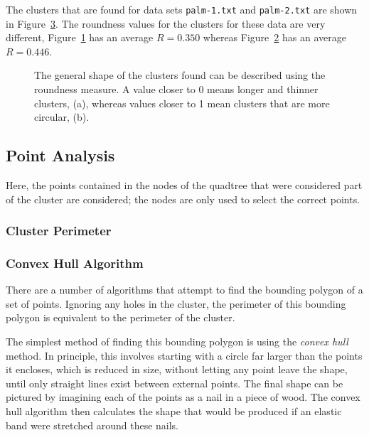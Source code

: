 The clusters that are found for data sets \texttt{palm-1.txt} and
\texttt{palm-2.txt} are shown in Figure~\ref{fig:roundness}. The roundness
values for the clusters for these data are very different,
Figure~\ref{fig:roundness-long.png} has an average $R=0.350$ whereas
Figure~\ref{fig:roundness-round.png} has an average $R=0.446$.

\begin{figure}[tbh]
	\centering
	\begin{subfigure}[b]{4.2cm}
		\caption{}\label{fig:roundness-long.png}
	\end{subfigure}%
	\quad
	\begin{subfigure}[b]{4.2cm}
		\caption{}\label{fig:roundness-round.png}
	\end{subfigure}

	\caption[A comparison of roundness values.]{The general shape of the
		clusters found can be described using the roundness measure. A value
		closer to 0 means longer and thinner clusters, (a), whereas values
		closer to 1 mean clusters that are more circular, (b).}\label{fig:roundness}
\end{figure}

\subsection{Point Analysis}
\label{sub:point_analysis}

Here, the points contained in the nodes of the quadtree that were considered
part of the cluster are considered; the nodes are only used to select the
correct points.

\subsubsection{Cluster Perimeter}
\label{ssub:cluster_perimeter_point}

\subsubsection*{Convex Hull Algorithm}
\label{ssub:Convex Hull Algorithm}

There are a number of algorithms that attempt to find the bounding polygon of a
set of points. Ignoring any holes in the cluster, the perimeter of this
bounding polygon is equivalent to the perimeter of the cluster.

The simplest method of finding this bounding polygon is using the \emph{convex
hull} method\cite{barber1996quickhull}. In principle, this involves starting
with a circle far larger than the points it encloses, which is reduced in size,
without letting any point leave the shape, until only straight lines exist
between external points. The final shape can be pictured by imagining each of
the points as a nail in a piece of wood. The convex hull algorithm then
calculates the shape that would be produced if an elastic band were stretched
around these nails.

